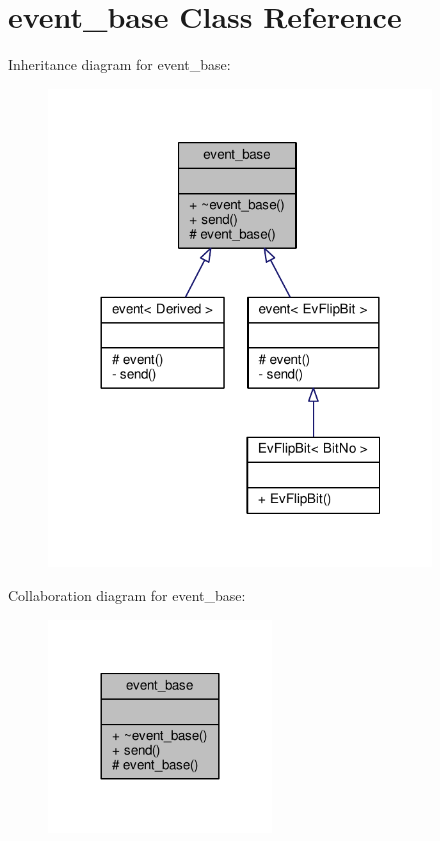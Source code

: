 \hypertarget{classevent__base}{}\section{event\+\_\+base Class Reference}
\label{classevent__base}


Inheritance diagram for event\+\_\+base\+:
\nopagebreak
\begin{figure}[H]
\begin{center}
\leavevmode
\includegraphics[width=288pt]{classevent__base__inherit__graph}
\end{center}
\end{figure}


Collaboration diagram for event\+\_\+base\+:
\nopagebreak
\begin{figure}[H]
\begin{center}
\leavevmode
\includegraphics[width=168pt]{classevent__base__coll__graph}
\end{center}
\end{figure}
